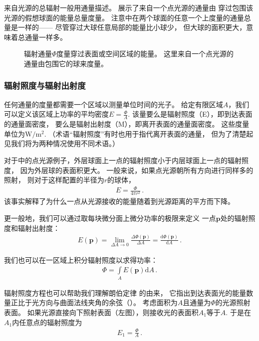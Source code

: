 来自光源的总辐射一般用通量描述。
展示了来自一个点光源的通量由
穿过包围该光源的假想球面的能量总量度量。
注意中在两个球面的任意一个上度量的通量总量是一样的——
尽管穿过大球任意局部的能量比小球少，
但大球的面积更大，意味着总通量一样多。
\begin{figure}[htbp]
    \centering
    \caption{辐射通量$\varPhi$度量穿过表面或空间区域的能量。
        这里来自一个点光源的通量由包围它的球来度量。}
    \label{fig:5.6}
\end{figure}

\subsubsection*{辐射照度与辐射出射度}
任何通量的度量都需要一个区域以测量单位时间的光子。
给定有限区域$A$，我们可以定义该区域上功率的平均密度$\displaystyle E=\frac{\varPhi}{A}$.
该量要么是{\sffamily 辐射照度}（E），即到达表面的通量面密度，
要么是{\sffamily 辐射出射度}（M），即离开表面的通量面密度。
这些度量单位为$\text{W}/\text{m}^2$.
（术语“辐射照度”有时也用于指代离开表面的通量，
但为了清楚起见我们将为两种情况使用不同术语。）

对于中的点光源例子，外层球面上一点的辐射照度小于内层球面上一点的辐射照度，
因为外层球的表面积更大。
一般来说，如果点光源朝所有方向进行同样多的照射，
则对于这样配置的半径为$r$的球体，
\begin{align*}
    E=\frac{\varPhi}{4\pi r^2}\, .
\end{align*}
该事实解释了为什么一点从光源接收的能量随着到光源距离的平方而下降。

更一般地，我们可以通过取每块微分面上微分功率的极限来定义
一点$\bm p$处的辐射照度和辐射出射度：
\begin{align*}
    E(\bm p)=\lim\limits_{\Delta A\rightarrow 0}{\frac{\Delta \varPhi(\bm p)}{\Delta A}}=\frac{\mathrm{d}\varPhi(\bm p)}{\mathrm{d}A}\, .
\end{align*}

我们也可以在一区域上积分辐射照度以求得功率：
\begin{align*}
    \varPhi=\int\limits_A E(\bm p)\mathrm{d}A\, .
\end{align*}

辐射照度方程也可以帮助我们理解{\sffamily 朗伯定律}
的由来，
它指出到达表面光的能量数量正比于光方向与曲面法线夹角的余弦（）。
考虑面积为$A$且通量为$\varPhi$的光源照射表面。
如果光源直接向下照射表面（左图），则接收光的表面积$A_1$等于$A$.
于是在$A_1$内任意点的辐射照度为
\begin{align*}
    E_1=\frac{\varPhi}{A}\, .
\end{align*}


